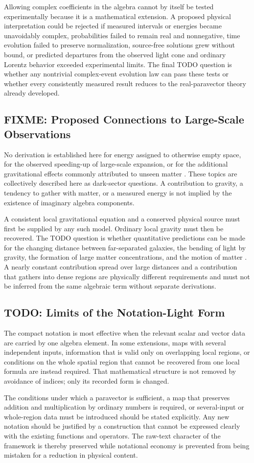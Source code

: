 Allowing complex coefficients in the algebra cannot by itself be tested
experimentally because it is a mathematical extension. A proposed physical
interpretation could be rejected if measured intervals or energies became
unavoidably complex, probabilities failed to remain real and nonnegative,
time evolution failed to preserve normalization, source-free solutions grew
without bound, or predicted departures from the observed light cone and
ordinary Lorentz behavior exceeded experimental limits. The final TODO
question is whether any nontrivial complex-event evolution law can pass these
tests or whether every consistently measured result reduces to the
real-paravector theory already developed.

\subsection{FIXME: Proposed Connections to Large-Scale Observations}
No derivation is established here for energy assigned to otherwise empty
space, for the observed speeding-up of large-scale expansion, or for the
additional gravitational effects commonly attributed to unseen matter
\cite{weinberg2008}. These topics are collectively described here as
dark-sector questions. A contribution to gravity, a tendency to gather with
matter, or a measured energy is not implied by the existence of imaginary
algebra components.

A consistent local gravitational equation and a conserved physical source
must first be supplied by any such model. Ordinary local gravity must then be
recovered. The TODO question is whether quantitative predictions can be made
for the changing distance between far-separated galaxies, the bending of
light by gravity, the formation of large matter concentrations, and the
motion of matter \cite{weinberg2008}. A nearly constant contribution spread
over large distances and a contribution that gathers into dense regions are
physically different requirements and must not be inferred from the same
algebraic term without separate derivations.

\subsection{TODO: Limits of the Notation-Light Form}
The compact notation is most effective when the relevant scalar and vector
data are carried by one algebra element. In some extensions, maps with several
independent inputs, information that is valid only on overlapping local
regions, or conditions on the whole spatial region that cannot be recovered
from one local formula
are instead required. That mathematical structure is not removed by avoidance of indices;
only its recorded form is changed.

The conditions under which a paravector is sufficient, a map that preserves
addition and multiplication by ordinary numbers is required, or
several-input or whole-region data must be introduced should be stated
explicitly. Any new notation should be justified by a construction that
cannot be expressed clearly with the existing functions and operators.
The raw-text character of the framework is thereby preserved while
notational economy is prevented from being mistaken for a reduction in
physical content.
